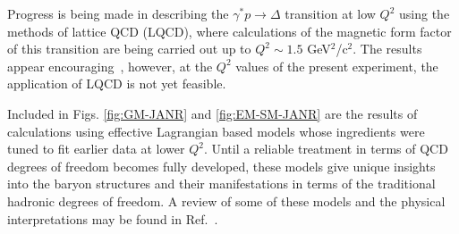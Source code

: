 \documentclass[aps,prl,twocolumn,superscriptaddress]{revtex4}
\begin{document}
Progress is being made in describing the $\gamma^* p\rightarrow \Delta$ 
transition at low $Q^2$ using the methods of lattice QCD (LQCD), where 
calculations of the magnetic form factor of this transition are being 
carried out up to $Q^2\sim1.5$ GeV$^2$/c$^2$. The results appear 
encouraging~\cite{bib:LQCD}, however, at the $Q^2$ values of the present 
experiment, the application of LQCD is not yet feasible.  

Included in Figs.  \ref{fig:GM-JANR}  and \ref{fig:EM-SM-JANR} are the 
results of calculations using effective Lagrangian based models whose 
ingredients were tuned to fit earlier data at  lower $Q^2$.  Until a reliable 
treatment in terms of QCD degrees of freedom becomes fully developed, these 
models give unique insights into the baryon structures and their 
manifestations in terms of the traditional hadronic degrees of freedom. 
A review of some of these models and the physical interpretations may be 
found in Ref.~\cite{bib:burk-lee}.
\end{document}
